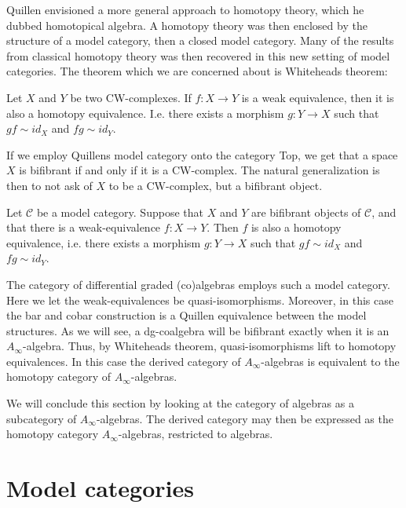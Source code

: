 \documentclass[../thesis.tex]{subfiles}
\begin{document}
    

    Quillen envisioned a more general approach to homotopy theory, which he dubbed homotopical algebra. A homotopy theory was then enclosed by the structure of a model category, then a closed model category. Many of the results from classical homotopy theory was then recovered in this new setting of model categories. The theorem which we are concerned about is Whiteheads theorem:

    \begin{thm}
        Let $X$ and $Y$ be two CW-complexes. If $f:X\rightarrow Y$ is a weak equivalence, then it is also a homotopy equivalence. I.e. there exists a morphism $g: Y\rightarrow X$ such that $gf\sim id_X$ and $fg\sim id_Y$.
    \end{thm}

    If we employ Quillens model category onto the category Top, we get that a space $X$ is bifibrant if and only if it is a CW-complex. The natural generalization is then to not ask of $X$ to be a CW-complex, but a bifibrant object.

    \begin{thm}
        Let $\mathcal{C}$ be a model category. Suppose that $X$ and $Y$ are bifibrant objects of $\mathcal{C}$, and that there is a weak-equivalence $f:X\rightarrow Y$. Then $f$ is also a homotopy equivalence, i.e. there exists a morphism $g: Y\rightarrow X$ such that $gf\sim id_X$ and $fg\sim id_Y$.
    \end{thm}

    The category of differential graded (co)algebras employs such a model category. Here we let the weak-equivalences be quasi-isomorphisms. Moreover, in this case the bar and cobar construction is a Quillen equivalence between the model structures. As we will see, a dg-coalgebra will be bifibrant exactly when it is an $A_\infty$-algebra. Thus, by Whiteheads theorem, quasi-isomorphisms lift to homotopy equivalences. In this case the derived category of $A_\infty$-algebras is equivalent to the homotopy category of $A_\infty$-algebras.

    We will conclude this section by looking at the category of algebras as a subcategory of $A_\infty$-algebras. The derived category may then be expressed as the homotopy category $A_\infty$-algebras, restricted to algebras.

    \section{Model categories}
\end{document}
